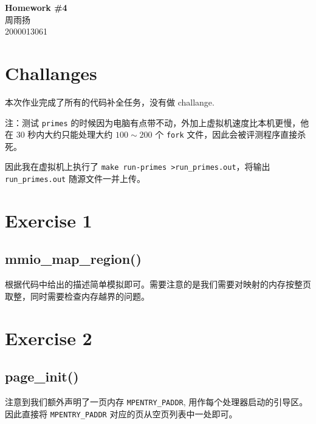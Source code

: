 \documentclass[11pt]{article}
\newcommand{\hwid}{4}			%
\newcommand{\name}{周雨扬} 		%
\newcommand{\id}{2000013061} 	%
\begin{document}
    \pagestyle{fancy}
    \chead{}

    \begin{center}
        {\LARGE \bf Homework \#\hwid}\\
        {\Large \name}\\
        {\Large \id}\\
    \end{center}

	\section{Challanges}
		\par 本次作业完成了所有的代码补全任务，没有做 challange.
		
		\par 注：测试 \texttt{primes} 的时候因为电脑有点带不动，外加上虚拟机速度比本机更慢，他在 30 秒内大约只能处理大约 $100 \sim 200$ 个 \texttt{fork} 文件，因此会被评测程序直接杀死。
		
		\par 因此我在虚拟机上执行了 \texttt{make run-primes >run\_primes.out}，将输出 \texttt{run\_primes.out} 随源文件一并上传。
		
	\section{Exercise 1}
	
		
	\subsection*{mmio\_map\_region()}
		\par 根据代码中给出的描述简单模拟即可。需要注意的是我们需要对映射的内存按整页取整，同时需要检查内存越界的问题。
		
	\section{Exercise 2}
	
	\subsection*{page\_init()}
	
		\par 注意到我们额外声明了一页内存 \texttt{MPENTRY\_PADDR}, 用作每个处理器启动的引导区。因此直接将 \texttt{MPENTRY\_PADDR} 对应的页从空页列表中一处即可。
		
\end{document}
